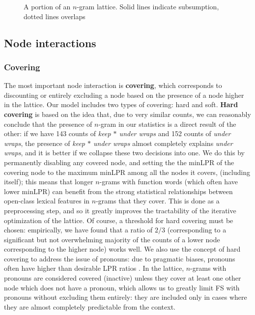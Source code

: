\documentclass[11pt,letterpaper]{article}
\newcommand{\gap}{$*$\xspace}
\newcommand{\ex}[1]{\textit{#1}\xspace}
\newcommand{\termdef}[1]{\textbf{#1}\xspace}
\begin{document}
\begin{figure}[!tb]
\caption{A portion of an $n$-gram lattice. Solid lines indicate subsumption, dotted lines overlaps}
\label{fig:example}
\end{figure}

\subsection{Node interactions}

\subsubsection{Covering}

The most important node interaction is \termdef{covering}, which corresponds to discounting or entirely excluding a node based on the presence of a node higher in the lattice. Our model includes two types of covering: hard and soft. \termdef{Hard covering} is based on the idea that, due to very similar counts, we can reasonably conclude that the presence of $n$-gram in our statistics is a direct result of the other: if we have 143 counts of \ex{keep \gap under wraps} and 152 counts of \ex{under wraps}, the presence of \ex{keep \gap under wraps} almost completely explains \ex{under wraps}, and it is better if we collapse these two decisions into one. We do this by permanently disabling any covered node, and setting the the minLPR of the covering node to the maximum minLPR among all the nodes it covers, (including itself); this means that longer $n$-grams with function words (which often have lower minLPR) can benefit from the strong statistical relationships between open-class lexical features in $n$-grams that they cover. This is done as a preprocessing step, and so it greatly improves the tractability of the iterative optimization of the lattice. Of course, a threshold for hard covering must be chosen: empirically, we have found that a ratio of $2/3$ (corresponding to a significant but not overwhelming majority of the counts of a lower node corresponding to the higher node) works well.  We also use the concept of hard covering to address the issue of pronouns: due to pragmatic biases, pronouns often have higher than desirable LPR ratios \cite{Brooke15b}. In the lattice, $n$-grams with pronouns are considered covered (inactive) unless they cover at least one other node which does not have a pronoun, which allows us to greatly limit FS with pronouns without excluding them entirely: they are included only in cases where they are almost completely predictable from the context. 
\end{document}
